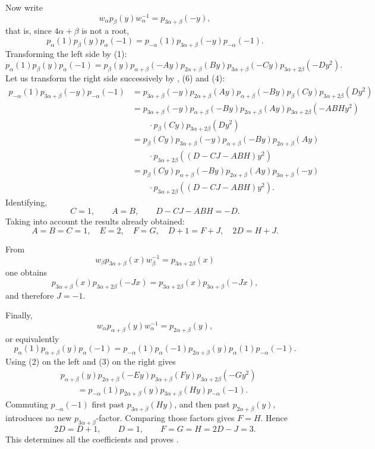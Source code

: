 Now write
\[
  w_\alpha p_\beta(y)w_\alpha^{-1}=p_{3\alpha+\beta}(-y),
\]
that is, since \(4\alpha+\beta\) is not a root,
\[
 p_\alpha(1)p_\beta(y)p_\alpha(-1)
  =p_{-\alpha}(1)p_{3\alpha+\beta}(-y)p_{-\alpha}(-1).
\]
Transforming the left side by (1):
\[
 p_\alpha(1)p_\beta(y)p_\alpha(-1)
 =p_\beta(y)p_{\alpha+\beta}(-Ay)p_{2\alpha+\beta}(By)
  p_{3\alpha+\beta}(-Cy)p_{3\alpha+2\beta}(-Dy^2).
\]
Let us transform the right side successively by , (6) and (4):
\[
\begin{aligned}
 p_{-\alpha}(1)p_{3\alpha+\beta}(-y)p_{-\alpha}(-1)
 &=p_{3\alpha+\beta}(-y)p_{2\alpha+\beta}(Ay)p_{\alpha+\beta}(-By)
   p_\beta(Cy)p_{3\alpha+2\beta}(Dy^2)\\
 &=p_{3\alpha+\beta}(-y)p_{\alpha+\beta}(-By)p_{2\alpha+\beta}(Ay)
   p_{3\alpha+2\beta}(-ABHy^2)\\
 &\qquad{}\cdot p_\beta(Cy)p_{3\alpha+2\beta}(Dy^2)\\
 &=p_\beta(Cy)p_{3\alpha+\beta}(-y)p_{\alpha+\beta}(-By)p_{2\alpha+\beta}(Ay)\\
 &\qquad{}\cdot p_{3\alpha+2\beta}((D-CJ-ABH)y^2)\\
 &=p_\beta(Cy)p_{\alpha+\beta}(-By)p_{2\alpha+\beta}(Ay)p_{3\alpha+\beta}(-y)\\
 &\qquad{}\cdot p_{3\alpha+2\beta}((D-CJ-ABH)y^2).
\end{aligned}
\]
Identifying,
\[
  C=1,\qquad A=B,\qquad D-CJ-ABH=-D.
\]
Taking into account the results already obtained:
\[
 A=B=C=1,\quad E=2,\quad F=G,\quad
 D+1=F+J,\quad 2D=H+J.
\]

From
\[
  w_\beta p_{3\alpha+\beta}(x)w_\beta^{-1}
    =p_{3\alpha+2\beta}(x)
\]
one obtains
\[
  p_{3\alpha+\beta}(x)p_{3\alpha+2\beta}(-Jx)
   =p_{3\alpha+2\beta}(x)p_{3\alpha+\beta}(-Jx),
\]
and therefore \(J=-1\).

Finally,
\[
  w_\alpha p_{\alpha+\beta}(y)w_\alpha^{-1}=p_{2\alpha+\beta}(y),
\]
or equivalently
\[
 p_\alpha(1)p_{\alpha+\beta}(y)p_\alpha(-1)
  =p_{-\alpha}(1)p_\alpha(-1)p_{2\alpha+\beta}(y)
    p_\alpha(1)p_{-\alpha}(-1).
\]
Using (2) on the left and (3) on the right gives
\[
\begin{aligned}
 &p_{\alpha+\beta}(y)p_{2\alpha+\beta}(-Ey)
   p_{3\alpha+\beta}(Fy)p_{3\alpha+2\beta}(-Gy^2)\\
 &\qquad=p_{-\alpha}(1)p_{2\alpha+\beta}(y)
   p_{3\alpha+\beta}(Hy)p_{-\alpha}(-1).
\end{aligned}
\]
Commuting \(p_{-\alpha}(-1)\) first past
\(p_{3\alpha+\beta}(Hy)\), and then past \(p_{2\alpha+\beta}(y)\),
introduces no new \(p_{3\alpha+\beta}\)-factor. Comparing those
factors gives \(F=H\). Hence
\[
  2D=D+1,\qquad D=1,\qquad F=G=H=2D-J=3.
\]
This determines all the coefficients and proves .

